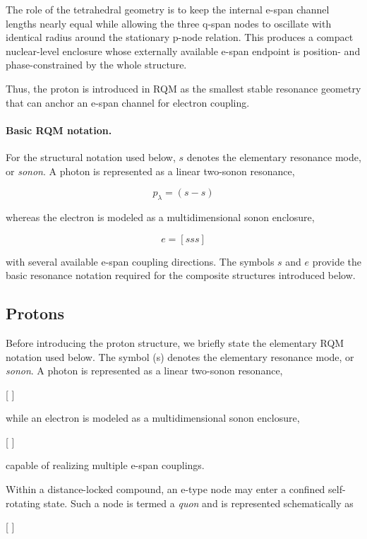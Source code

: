 \documentclass[11pt,a4paper]{article}
\begin{document}
The role of the tetrahedral geometry is to keep the internal e-span channel lengths nearly equal while allowing the three q-span nodes to oscillate with identical radius around the stationary p-node relation. This produces a compact nuclear-level enclosure whose externally available e-span endpoint is position- and phase-constrained by the whole structure.

Thus, the proton is introduced in RQM as the smallest stable resonance geometry that can anchor an e-span channel for electron coupling.


\paragraph{Basic RQM notation.}
For the structural notation used below, \(s\) denotes the elementary resonance
mode, or \emph{sonon}. A photon is represented as a linear two-sonon resonance,

\[
\boxed{
p_{\lambda}=(s-s)
}
\]

whereas the electron is modeled as a multidimensional sonon enclosure,

\[
\boxed{
e=[sss]
}
\]

with several available e-span coupling directions. The symbols \(s\) and \(e\)
provide the basic resonance notation required for the composite structures
introduced below.




\subsection{Protons}

Before introducing the proton structure, we briefly state the elementary RQM notation used below. The symbol (s) denotes the elementary resonance mode, or \emph{sonon}. A photon is represented as a linear two-sonon resonance,

[
]

while an electron is modeled as a multidimensional sonon enclosure,

[
]

capable of realizing multiple e-span couplings.

Within a distance-locked compound, an e-type node may enter a confined self-rotating state. Such a node is termed a \emph{quon} and is represented schematically as

[
]
\end{document}
